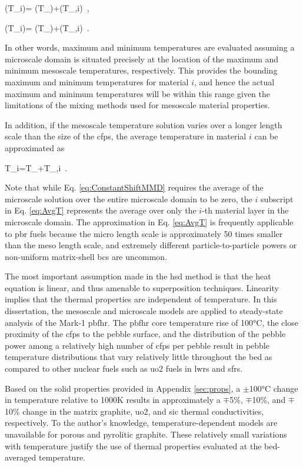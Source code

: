 \beq
\label{eq:MaxT}
\left(T_{i}\right)= \left(T_\right)+\left(T_{,i}\right)\ ,
\eeq

\beq
\label{eq:MinT}
\left(T_{i}\right)= \left(T_\right)+\left(T_{,i}\right)\ .
\eeq

\noindent In other words, maximum and minimum temperatures are evaluated assuming a microscale domain is situated precisely at the location of the maximum and minimum mesoscale temperatures, respectively. This provides the bounding maximum and minimum temperatures for material \(i\), and hence the actual maximum and minimum temperatures will be within this range given the limitations of the mixing methods used for mesoscale material properties.

In addition, if the mesoscale temperature solution varies over a longer length scale than the size of the \glspl{cfp}, the average temperature in material \(i\) can be approximated as

\beq
\label{eq:AvgT}
\la T_i\ra=\la T_\ra+\la T_{,i}\ra\ .
\eeq

\noindent Note that while Eq. \eqref{eq:ConstantShiftMMD} requires the average of the microscale solution over the entire microscale domain to be zero, the $i$ subscript in Eq. \eqref{eq:AvgT} represents the average over only the $i$-th material layer in the microscale domain. The approximation in Eq. \eqref{eq:AvgT} is frequently applicable to \gls{pbr} fuels because the micro length scale is approximately 50 times smaller than the meso length scale, and extremely different particle-to-particle powers or non-uniform matrix-shell \glspl{bc} are uncommon.

The most important assumption made in the \gls{hsd} method is that the heat equation is linear, and thus amenable to superposition techniques. Linearity implies that the thermal properties are independent of temperature. In this dissertation, the mesoscale and microscale models are applied to steady-state analysis of the Mark-1 \gls{pbfhr}. The \gls{pbfhr} core temperature rise of 100\si{\celsius}, the close proximity of the \glspl{cfp} to the pebble surface, and the distribution of the pebble power among a relatively high number of \glspl{cfp} per pebble result in pebble temperature distributions that vary relatively little throughout the bed as compared to other nuclear fuels such as \gls{uo2} fuels in \glspl{lwr} and \glspl{sfr}. 

Based on the solid properties provided in Appendix \ref{sec:props}, a \(\pm\)100\si{\celsius} change in temperature relative to 1000\si{\kelvin} results in approximately a \(\mp\)5\%, \(\mp\)10\%, and \(\mp\)10\% change in the matrix graphite, \gls{uo2}, and \gls{sic} thermal conductivities, respectively. To the author's knowledge, temperature-dependent models are unavailable for porous and pyrolitic graphite. These relatively small variations with temperature justify the use of thermal properties evaluated at the bed-averaged temperature.

